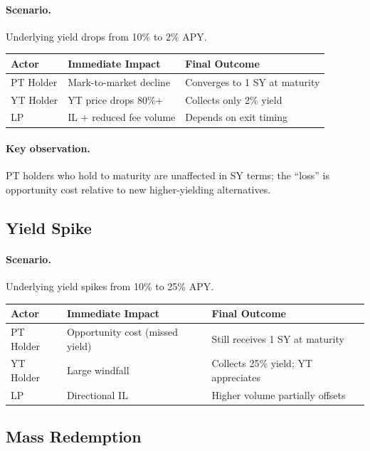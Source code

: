 \paragraph{Scenario.} Underlying yield drops from 10\% to 2\% APY.

\begin{center}
\begin{tabular}{lll}
\toprule
\textbf{Actor} & \textbf{Immediate Impact} & \textbf{Final Outcome} \\
\midrule
PT Holder & Mark-to-market decline & Converges to 1 SY at maturity \\
YT Holder & YT price drops 80\%+ & Collects only 2\% yield \\
LP & IL + reduced fee volume & Depends on exit timing \\
\bottomrule
\end{tabular}
\end{center}

\paragraph{Key observation.} PT holders who hold to maturity are unaffected in SY terms; the ``loss'' is opportunity cost relative to new higher-yielding alternatives.

\subsection{Yield Spike}

\paragraph{Scenario.} Underlying yield spikes from 10\% to 25\% APY.

\begin{center}
\begin{tabular}{lll}
\toprule
\textbf{Actor} & \textbf{Immediate Impact} & \textbf{Final Outcome} \\
\midrule
PT Holder & Opportunity cost (missed yield) & Still receives 1 SY at maturity \\
YT Holder & Large windfall & Collects 25\% yield; YT appreciates \\
LP & Directional IL & Higher volume partially offsets \\
\bottomrule
\end{tabular}
\end{center}

\subsection{Mass Redemption}

